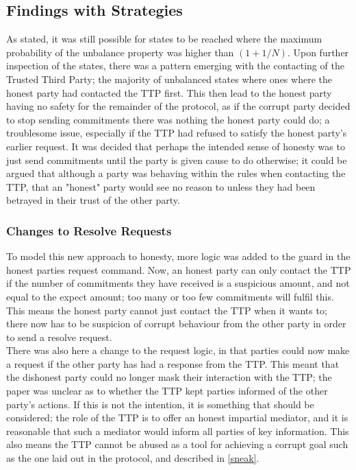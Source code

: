 \documentclass{l4proj}
\begin{document}
\subsection{Findings with Strategies}

As stated, it was still possible for states to be reached where the maximum probability of the unbalance property was higher than $(1+1/ N)$. Upon further inspection of the states, there was a pattern emerging with the contacting of the Trusted Third Party; the majority of unbalanced states where ones where the honest party had contacted the TTP first. This then lead to the honest party having no safety for the remainder of the protocol, as if the corrupt party decided to stop sending commitments there was nothing the honest party could do; a troublesome issue, especially if the TTP had refused to satisfy the honest party's earlier request. It was decided that perhaps the intended sense of honesty was to just send commitments until the party is given cause to do otherwise; it could be argued that although a party was behaving within the rules when contacting the TTP, that an "honest" party would see no reason to unless they had been betrayed in their trust of the other party.

\subsubsection{Changes to Resolve Requests}

To model this new approach to honesty, more logic was added to the guard in the honest parties request command. Now, an honest party can only contact the TTP if the number of commitments they have received is a suspicious amount, and not equal to the expect amount; too many or too few commitments will fulfil this. This means the honest party cannot just contact the TTP when it wants to; there now has to be suspicion of corrupt behaviour from the other party in order to send a resolve request.\\
There was also here a change to the request logic, in that parties could now make a request if the other party has had a response from the TTP. This meant that the dishonest party could no longer mask their interaction with the TTP; the paper was unclear as to whether the TTP kept parties informed of the other party's actions. If this is not the intention, it is something that should be considered; the role of the TTP is to offer an honest impartial mediator, and it is reasonable that such a mediator would inform all parties of key information. This also means the TTP cannot be abused as a tool for achieving a corrupt goal such as the one laid out in the protocol, and described in \ref{sneak}. 
\end{document}

